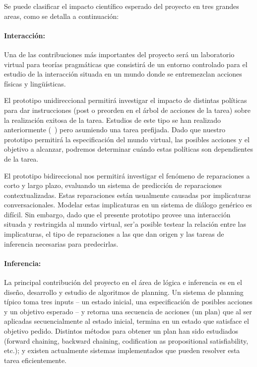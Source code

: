 
Se puede clasificar el impacto cient\'ifico
esperado del proyecto en tres grandes areas, como se detalla a continuaci\'on:

\paragraph{Interacci\'on:}
Una de las contribuciones m\'as
importantes del proyecto ser\'a un laboratorio virtual para
teor\'ias pragm\'aticas que consistir\'a de un
entorno controlado para el estudio de la interacci\'on situada en un mundo donde
se entremezclan acciones f\'isicas y ling\"u\'isticas. 

El prototipo unidireccional permitir\'a
investigar el impacto de distintas
pol\'iticas para dar instrucciones (post o
preorden en el \'arbol de acciones de la tarea)
sobre la realizaci\'on exitosa de la tarea.
Estudios de este tipo se han realizado anteriormente
(~\citep{foster-etal-ijcai2009}) pero 
asumiendo una tarea prefijada.
Dado que nuestro prototipo permitir\'a la especificaci\'on
del mundo virtual, las posibles acciones y el objetivo
a alcanzar, podremos determinar cu\'ando estas pol\'iticas
son dependientes de la tarea.

El prototipo bidireccional nos permitir\'a investigar el
fen\'omeno de reparaciones a corto y largo plazo,
evaluando un sistema de predicci\'on de reparaciones
contextualizadas.  Estas reparaciones est\'an usualmente
causadas por implicaturas conversacionales.  Modelar
estas implicaturas en un sistema de di\'alogo gen\'erico
es dif\'icil.  Sin embargo, dado que el presente prototipo provee una
interacci\'on situada
y restringida al mundo virtual, ser'a posible testear la relaci\'on entre
las implicaturas, el tipo de reparaciones a las que
dan origen y las tareas de inferencia necesarias para
predecirlas.



\paragraph{Inferencia:} La principal contribuci\'on del
proyecto en el \'area de l\'ogica e inferencia es en el
dise\~no, desarrollo y estudio de algoritmos de planning.
Un sistema de planning t\'ipico toma tres inputs -- un
estado inicial, una especificaci\'on de posibles acciones y
un objetivo esperado -- y retorna una secuencia de acciones (un plan)
que al ser aplicadas secuencialmente al estado inicial, termina
en un estado que satisface el objetivo pedido.  Distintos
m\'etodos para obtener un plan han sido estudiados (forward chaining, backward
chaining, codification as propositional
satisfiability, etc.); y existen actualmente sistemas
implementados que pueden resolver esta tarea eficientemente.


